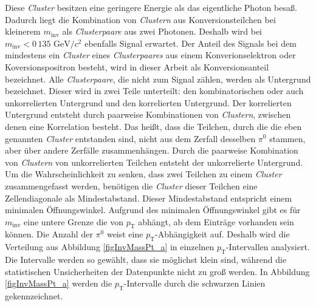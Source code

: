 Diese \textit{Cluster} besitzen eine geringere Energie als das eigentliche Photon besaß.
Dadurch liegt die Kombination von \textit{Clustern} aus Konversionsteilchen bei kleinerem $m_\text{inv}$ als \textit{Clusterpaare} aus zwei Photonen.
Deshalb wird bei $m_\text{inv}<0\,135\text{ GeV}/c^{2}$ ebenfalls Signal erwartet.
Der Anteil des Signals bei dem mindestens ein \textit{Cluster} eines \textit{Clusterpaares} aus einem Konverionselektron oder Koversionspositron besteht, wird in dieser Arbeit als Konversionsanteil bezeichnet. 
\newline
Alle \textit{Clusterpaare}, die nicht zum Signal zählen, werden als Untergrund bezeichnet.
Dieser wird in zwei Teile unterteilt: den kombinatorischen oder auch unkorrelierten Untergrund und den korrelierten Untergrund.
Der korrelierten Untergrund entsteht durch paarweise Kombinationen von \textit{Clustern}, zwischen denen eine Korrelation besteht.
Das heißt, dass die Teilchen, durch die die eben genannten \textit{Cluster} entstanden sind, nicht aus dem Zerfall desselben $\pi^{0}$ stammen, aber über andere Zerfälle zusammenhängen.
Durch die paarweise Kombination von \textit{Clustern} von unkorrelierten Teilchen entsteht der unkorrelierte Untergrund.
\newline
Um die Wahrscheinlichkeit zu senken, dass zwei Teilchen zu einem \textit{Cluster} zusammengefasst werden, benötigen die \textit{Cluster} dieser Teilchen eine Zellendiagonale als Mindestabstand.
Dieser Mindestabstand entspricht einem minimalen Öffnungswinkel.
Aufgrund des minimalen Öffnungswinkel gibt es für $m_\text{inv}$ eine untere Grenze die von $p_\text{T}$ abhängt, ab dem Einträge vorhanden sein können.
\newline
Die Anzahl der $\pi^{0}$ weist eine $p_{\text{T}}$-Abhängigkeit auf.
Deshalb wird die Verteilung aus Abbildung \ref{figInvMassPt_a} in einzelnen $p_{\text{T}}$-Intervallen analysiert.
Die Intervalle werden so gewählt, dass sie möglichst klein sind, während die statistischen Unsicherheiten der Datenpunkte nicht zu groß werden.
In Abbildung \ref{figInvMassPt_a} werden die $p_{\text{T}}$-Intervalle durch die schwarzen Linien gekennzeichnet.
